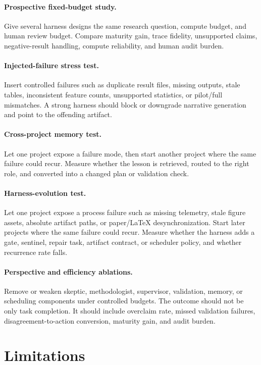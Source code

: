 \documentclass{article}
\begin{document}
\paragraph{Prospective fixed-budget study.} Give several harness designs the same research question, compute budget, and human review budget. Compare maturity gain, trace fidelity, unsupported claims, negative-result handling, compute reliability, and human audit burden.

\paragraph{Injected-failure stress test.} Insert controlled failures such as duplicate result files, missing outputs, stale tables, inconsistent feature counts, unsupported statistics, or pilot/full mismatches. A strong harness should block or downgrade narrative generation and point to the offending artifact.

\paragraph{Cross-project memory test.} Let one project expose a failure mode, then start another project where the same failure could recur. Measure whether the lesson is retrieved, routed to the right role, and converted into a changed plan or validation check.

\paragraph{Harness-evolution test.} Let one project expose a process failure such as missing telemetry, stale figure assets, absolute artifact paths, or paper/LaTeX desynchronization. Start later projects where the same failure could recur. Measure whether the harness adds a gate, sentinel, repair task, artifact contract, or scheduler policy, and whether recurrence rate falls.

\paragraph{Perspective and efficiency ablations.} Remove or weaken skeptic, methodologist, supervisor, validation, memory, or scheduling components under controlled budgets. The outcome should not be only task completion. It should include overclaim rate, missed validation failures, disagreement-to-action conversion, maturity gain, and audit burden.

\section{Limitations}
\label{sec:appendix-limitations}
\end{document}
